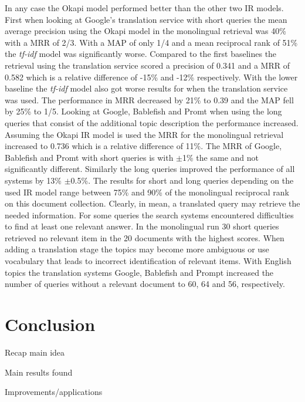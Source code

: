 \documentclass[journal]{IEEEtran}
\begin{document}
In any case the Okapi model performed better than the other two IR models.
First when looking at Google's translation service with short queries the mean average precision using the Okapi model in the monolingual retrieval was 40\% with a MRR of 2/3.
With a MAP of only 1/4 and a mean reciprocal rank of 51\% the \textit{tf-idf} model was significantly worse.
Compared to the first baselines the retrieval using the translation service scored a precision of 0.341 and a MRR of 0.582 which is a relative difference of -15\% and -12\% respectively.
With the lower baseline the \textit{tf-idf} model also got worse results for when the translation service was used.
The performance in MRR decreased by 21\% to 0.39 and the MAP fell by 25\% to 1/5.
Looking at Google, Bablefish and Promt when using the long queries that consist of the additional topic description the performance increased.
Assuming the Okapi IR model is used the MRR for the monolingual retrieval increased to 0.736 which is a relative difference of 11\%.
The MRR of Google, Bablefish and Promt with short queries is with $\pm$1\% the same and not significantly different.
Similarly the long queries improved the performance of all systems by 13\% $\pm$0.5\%.
The results for short and long queries depending on the used IR model range between 75\% and 90\% of the monolingual reciprocal rank on this document collection.
Clearly, in mean, a translated query may retrieve the needed information.
For some queries the search systems encountered difficulties to find at least one relevant answer.
In the monolingual run 30 short queries retrieved no relevant item in the 20 documents with the highest scores.
When adding a translation stage the topics may become more ambiguous or use vocabulary that leads to incorrect identification of relevant items.
With English topics the translation systems Google, Bablefish and Prompt increased the number of queries without a relevant document to 60, 64 and 56, respectively.



\section{Conclusion}
Recap main idea

Main results found

Improvements/applications

\cite{peters12}





\end{document}
